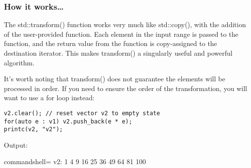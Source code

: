 \subsubsection{How it works…}

The std::transform() function works very much like std::copy(), with the addition of the user-provided function. Each element in the input range is passed to the function, and the return value from the function is copy-assigned to the destination iterator. This makes transform() a singularly useful and powerful algorithm.

It's worth noting that transform() does not guarantee the elements will be processed in order. If you need to ensure the order of the transformation, you will want to use a for loop instead:

\begin{lstlisting}[style=styleCXX]
v2.clear(); // reset vector v2 to empty state
for(auto e : v1) v2.push_back(e * e);
printc(v2, "v2");
\end{lstlisting}

Output:

\begin{tcblisting}{commandshell={}}
v2: 1 4 9 16 25 36 49 64 81 100
\end{tcblisting}
















